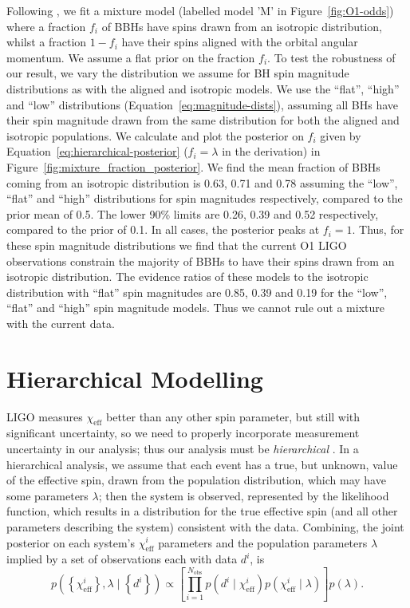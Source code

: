 \documentclass[modern,linenumbers]{aastex61}
\newcommand{\chieff}{\chi_\mathrm{eff}}
\begin{document}
Following \citet{Stevenson:2017spin},  we fit a mixture model (labelled model 'M' in Figure~\ref{fig:O1-odds}) where a fraction $f_i$ of BBHs have spins drawn from an isotropic distribution, whilst a fraction $1 - f_i$ have their spins aligned with the orbital angular momentum. We assume a flat prior on the fraction $f_i$. To test the robustness of our result, we vary the distribution we assume for BH spin magnitude distributions as with the aligned and isotropic models. We use the ``flat'', ``high'' and ``low'' distributions (Equation~\ref{eq:magnitude-dists}), assuming all BHs have their spin magnitude drawn from the same distribution for both the aligned and isotropic populations. We calculate and plot the posterior on $f_i$ given by Equation~\ref{eq:hierarchical-posterior} ($f_i=\lambda$ in the derivation) in Figure~\ref{fig:mixture_fraction_posterior}. We find the mean fraction of BBHs coming from an isotropic distribution is 0.63, 0.71 and 0.78 assuming the ``low'', ``flat'' and ``high'' distributions for spin magnitudes respectively, compared to the prior mean of 0.5. The lower 90\% limits are 0.26, 0.39 and 0.52 respectively, compared to the prior of 0.1. In all cases, the posterior peaks at $f_i = 1$. Thus, for these spin magnitude distributions we find that the current O1 LIGO observations constrain the majority of BBHs to have their spins drawn from an isotropic distribution. The evidence ratios of these models to the isotropic distribution with ``flat'' spin magnitudes are 0.85, 0.39 and 0.19 for the ``low'', ``flat'' and ``high'' spin magnitude models. Thus we cannot rule out a mixture with the current data. 

\section{Hierarchical Modelling} 
\label{sec:hierarchical}

LIGO measures $\chieff$ better than any other spin parameter, but
still with significant uncertainty, so we need to properly incorporate
measurement uncertainty in our analysis; thus our analysis must be
\emph{hierarchical} \citep{2010ApJ...725.2166H,2010PhRvD..81h4029M}.
In a hierarchical analysis, we assume that each event has a true, but
unknown, value of the effective spin, drawn from the population
distribution, which may have some parameters $\lambda$; then the
system is observed, represented by the likelihood function, which
results in a distribution for the true effective spin (and all other
parameters describing the system) consistent with the data.
Combining, the joint posterior on each system's $\chieff^i$ parameters
and the population parameters $\lambda$ implied by a set of
observations each with data $d^i$, is
\begin{equation}
  p\left( \left\{ \chieff^i \right\}, \lambda \mid \left\{ d^i \right\} \right) \propto \left[ \prod_{i=1}^{N_\mathrm{obs}} p\left(d^i \mid \chieff^i \right) p\left( \chieff^i \mid \lambda \right) \right] p\left(\lambda\right).
\end{equation}
\end{document}
